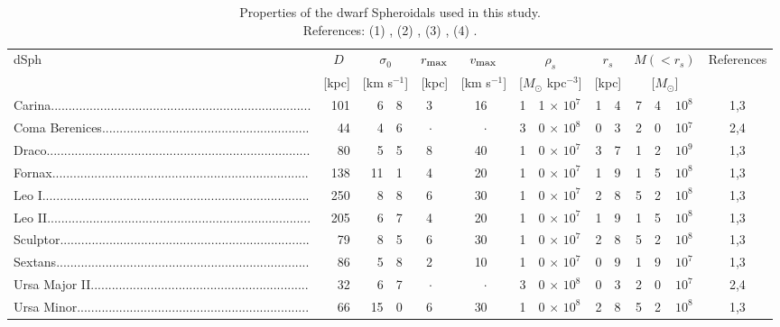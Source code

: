 \documentclass[aps,prd,twocolumn,amsmath,amssymb,floatfix,nofootinbib,10pt]{revtex4}
\newcommand{\rhos}{\ensuremath{\rho_s}}
\newcommand{\rs}{\ensuremath{r_s}}
\newcommand{\dist}{\ensuremath{D}}
\newcommand{\Msol}{\ensuremath{M_{\odot}}}
\newcommand{\Msun}{\Msol}
\newcommand{\vmax}{\ensuremath{v_{\mbox{{\footnotesize max}}}}}
\newcommand{\rmax}{\ensuremath{r_{\mbox{{\footnotesize max}}}}}
\begin{document}
\begingroup
\begin{table}
\begin{ruledtabular}
\begin{tabular}{lrr@{.}lr@{}lr@{}lr@{.}lr@{.}lr@{.}l@{ $\times$ }lc}
dSph & \dist\ & \multicolumn{2}{c}{$\sigma_0$}\ & \multicolumn{2}{c}{\rmax} & \multicolumn{2}{c}{\vmax} & \multicolumn{2}{c}{\rhos} & \multicolumn{2}{c}{\rs} & \multicolumn{3}{c}{$M(<\rs)$} & References\\
& [kpc] & \multicolumn{2}{c}{[km s$^{-1}$]} & \multicolumn{2}{c}{[kpc]} & \multicolumn{2}{c}{[km s$^{-1}$]} & \multicolumn{2}{c}{[$\Msun$ kpc$^{-3}$]} & \multicolumn{2}{c}{[kpc]} & \multicolumn{3}{c}{[$\Msun$]}&\\[4pt]
\hline
Carina.......................................................................... & 101 & 6&8 & 3&\phantom{f}      & 16&$\!\!\!$      & 1&1 $\times$ $10^7$ & 1&4 & 7&4&$10^8$ & 1,3\\
Coma Berenices...........................................................      & 44  & 4&6 & $\cdot$&& $\cdot$& & 3&0 $\times$ $10^8$ & 0&3 & 2&0&10$^7$ & 2,4\\
Draco........................................................................... & 80  & 5&5 & 8&      & 40&      & 1&0 $\times$ $10^7$ & 3&7 & 1&2&$10^9$ & 1,3\\
Fornax.........................................................................  & 138 & 11&1& 4&      & 20&      & 1&0 $\times$ $10^7$ & 1&9 & 1&5&$10^8$ & 1,3\\
Leo I............................................................................  & 250 & 8&8 & 6&      & 30&      & 1&0 $\times$ $10^7$ & 2&8 & 5&2&$10^8$ & 1,3\\
Leo II...........................................................................  & 205 & 6&7 & 4&      & 20&      & 1&0 $\times$ $10^7$ & 1&9 & 1&5&$10^8$ & 1,3\\
Sculptor.......................................................................  & 79  & 8&5 & 6&      & 30&      & 1&0 $\times$ $10^7$ & 2&8 & 5&2&$10^8$ & 1,3\\
Sextans........................................................................  & 86  & 5&8 & 2&      & 10&      & 1&0 $\times$ $10^7$ & 0&9 & 1&9&$10^7$ & 1,3\\
Ursa Major II..............................................................   & 32  & 6&7 & $\cdot$&& $\cdot$& & 3&0 $\times$ $10^8$ & 0&3 & 2&0&$10^7$ & 2,4\\
Ursa Minor..................................................................    & 66  & 15&0& 6&      & 30&      & 1&0 $\times$ $10^8$ & 2&8 & 5&2&$10^8$ & 1,3\\
\end{tabular}
\end{ruledtabular}
\caption{Properties of the dwarf Spheroidals used in this study.\\
References: (1) \citet{2008ApJ...672..904P}, (2) \citet{2008ApJ...678..614S}, (3) \citet{1998ARA&A..36..435M}, (4) \citet{2007ApJ...670..313S}.}\label{tab:dsphs}
\end{table}
\end{document}
